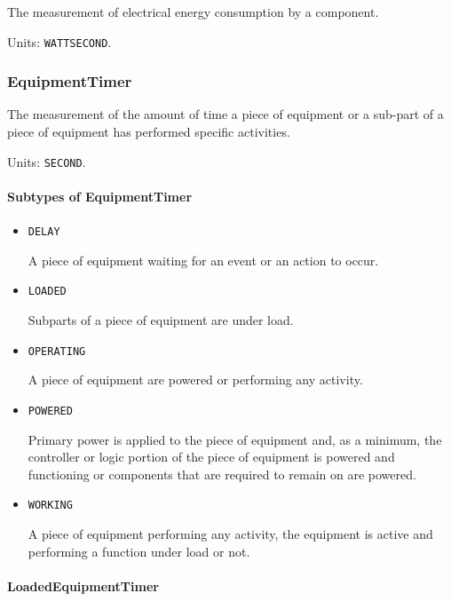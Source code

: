 The measurement of electrical energy consumption by a component.


Units: \texttt{WATT\textunderscore SECOND}.

\subsubsection{EquipmentTimer}
\label{sec:EquipmentTimer}



The measurement of the amount of time a piece of equipment or a sub-part of a piece of equipment has performed specific activities.


Units: \texttt{SECOND}.

\paragraph{Subtypes of EquipmentTimer}\mbox{}
\label{sec:Subtypes of EquipmentTimer}

\begin{itemize}

\item \texttt{DELAY}


A piece of equipment waiting for an event or an action to occur.

\item \texttt{LOADED}


Subparts of a piece of equipment are under load.

\item \texttt{OPERATING}


A piece of equipment are powered or performing any activity.

\item \texttt{POWERED}


Primary  power is  applied  to the  piece  of  equipment and,  as  a minimum, the controller or logic portion of the piece of equipment is powered and functioning or components that are required to remain on are powered.

\item \texttt{WORKING}


A piece of equipment performing any activity, the equipment is active and performing a function under load or not.


\end{itemize}

\paragraph{LoadedEquipmentTimer}\mbox{}
\label{sec:LoadedEquipmentTimer}


